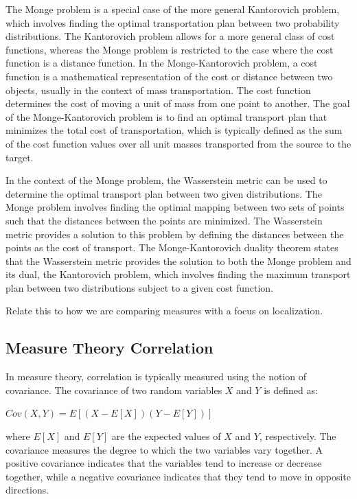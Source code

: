 \documentclass[12pt]{article} %
\theoremstyle{plain}
\begin{document}
	The Monge problem is a special case of the more general Kantorovich problem, which involves finding the optimal transportation plan between two probability distributions. The Kantorovich problem allows for a more general class of cost functions, whereas the Monge problem is restricted to the case where the cost function is a distance function. In the Monge-Kantorovich problem, a cost function is a mathematical representation of the cost or distance between two objects, usually in the context of mass transportation. The cost function determines the cost of moving a unit of mass from one point to another. The goal of the Monge-Kantorovich problem is to find an optimal transport plan that minimizes the total cost of transportation, which is typically defined as the sum of the cost function values over all unit masses transported from the source to the target.
	
	
	
	In the context of the Monge problem, the Wasserstein metric can be used to determine the optimal transport plan between two given distributions. The Monge problem involves finding the optimal mapping between two sets of points such that the distances between the points are minimized. The Wasserstein metric provides a solution to this problem by defining the distances between the points as the cost of transport. The Monge-Kantorovich duality theorem states that the Wasserstein metric provides the solution to both the Monge problem and its dual, the Kantorovich problem, which involves finding the maximum transport plan between two distributions subject to a given cost function.
	
	
	Relate this to how we are comparing measures with a focus on localization.
	
	
	
	\subsection{Measure Theory Correlation}
	
	
	In measure theory, correlation is typically measured using the notion of covariance. The covariance of two random variables $X$ and $Y$ is defined as:
	
	$Cov(X,Y) = E[(X - E[X])(Y - E[Y])]$
	
	\noindent where $E[X]$ and $E[Y]$ are the expected values of $X$ and $Y$, respectively. The covariance measures the degree to which the two variables vary together. A positive covariance indicates that the variables tend to increase or decrease together, while a negative covariance indicates that they tend to move in opposite directions.
	
\end{document}
